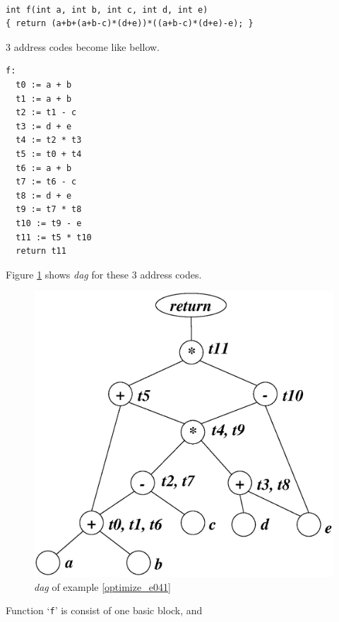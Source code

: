 \begin{Example}
\label{optimize_e041}
\begin{verbatim}

int f(int a, int b, int c, int d, int e)
{ return (a+b+(a+b-c)*(d+e))*((a+b-c)*(d+e)-e); }
\end{verbatim}
3 address codes become like bellow.
\begin{verbatim}
f:
  t0 := a + b
  t1 := a + b
  t2 := t1 - c
  t3 := d + e
  t4 := t2 * t3
  t5 := t0 + t4
  t6 := a + b
  t7 := t6 - c
  t8 := d + e
  t9 := t7 * t8
  t10 := t9 - e
  t11 := t5 * t10
  return t11
\end{verbatim}
Figure \ref{optimize_e042} shows {\em dag} for these 3 address codes.
\begin{figure}[htbp]
\begin{center}
\includegraphics[width=1.051\linewidth,height=1.0\linewidth]{opt022.eps}
\caption{{\em dag} of example \ref{optimize_e041}}
\label{optimize_e042}
\end{center}
\end{figure}
Function `{\tt{f}}' is consist of one basic block, and 

\end{Example}
